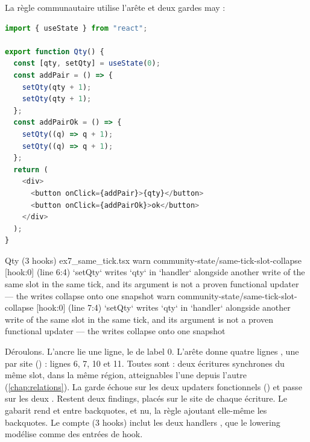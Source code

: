 La règle communautaire  utilise l'arête  et deux gardes may :



\begin{lstlisting}[language=TypeScript,caption={Deux incréments qui n'en font qu'un (\file{/tmp/ch22/ex7\_same\_tick.tsx})},label={lst:decl-ex7}]
import { useState } from "react";

export function Qty() {
  const [qty, setQty] = useState(0);
  const addPair = () => {
    setQty(qty + 1);
    setQty(qty + 1);
  };
  const addPairOk = () => {
    setQty((q) => q + 1);
    setQty((q) => q + 1);
  };
  return (
    <div>
      <button onClick={addPair}>{qty}</button>
      <button onClick={addPairOk}>ok</button>
    </div>
  );
}
\end{lstlisting}

\begin{sortie}
  Qty  (3 hooks)  ex7_same_tick.tsx
    warn   community-state/same-tick-slot-collapse  [hook:0]  (line 6:4)  `setQty` writes `qty` in `handler` alongside another write of the same slot in the same tick, and its argument is not a proven functional updater — the writes collapse onto one snapshot
    warn   community-state/same-tick-slot-collapse  [hook:0]  (line 7:4)  `setQty` writes `qty` in `handler` alongside another write of the same slot in the same tick, and its argument is not a proven functional updater — the writes collapse onto one snapshot
\end{sortie}

Déroulons. L'ancre lie une ligne, le  de label 0. L'arête  donne quatre lignes , une par site () : lignes 6, 7, 10 et 11. Toutes sont  : deux écritures synchrones du même slot, dans la même région, atteignables l'une depuis l'autre (\cref{chap:relations}). La garde  échoue sur les deux updaters fonctionnels  () et passe sur les deux . Restent deux findings, placés sur le site de chaque écriture. Le gabarit rend  et  entre backquotes, et  nu, la règle ajoutant elle-même les backquotes. Le compte \og (3 hooks)\fg{} inclut les deux handlers , que le lowering modélise comme des entrées de hook.

